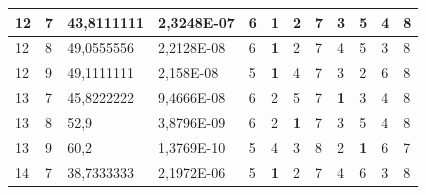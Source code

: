\documentclass[conference]{IEEEtran}
\begin{document}
\begin{table}[]
\begin{tabular}{|llll|llllllll|}
		\multicolumn{1}{|l|}{12}  & \multicolumn{1}{l|}{7}         & \multicolumn{1}{l|}{43,8111111}    & 2,3248E-07 & \multicolumn{1}{l|}{6}   & \multicolumn{1}{l|}{\textbf{1}} & \multicolumn{1}{l|}{2}          & \multicolumn{1}{l|}{7}   & \multicolumn{1}{l|}{3}          & \multicolumn{1}{l|}{5}          & \multicolumn{1}{l|}{4}          & 8                      \\ \hline
		\multicolumn{1}{|l|}{12}  & \multicolumn{1}{l|}{8}         & \multicolumn{1}{l|}{49,0555556}    & 2,2128E-08 & \multicolumn{1}{l|}{6}   & \multicolumn{1}{l|}{\textbf{1}} & \multicolumn{1}{l|}{2}          & \multicolumn{1}{l|}{7}   & \multicolumn{1}{l|}{4}          & \multicolumn{1}{l|}{5}          & \multicolumn{1}{l|}{3}          & 8                      \\ \hline
		\multicolumn{1}{|l|}{12}  & \multicolumn{1}{l|}{9}         & \multicolumn{1}{l|}{49,1111111}    & 2,158E-08  & \multicolumn{1}{l|}{5}   & \multicolumn{1}{l|}{\textbf{1}} & \multicolumn{1}{l|}{4}          & \multicolumn{1}{l|}{7}   & \multicolumn{1}{l|}{3}          & \multicolumn{1}{l|}{2}          & \multicolumn{1}{l|}{6}          & 8                      \\ \hline
		\multicolumn{1}{|l|}{13}  & \multicolumn{1}{l|}{7}         & \multicolumn{1}{l|}{45,8222222}    & 9,4666E-08 & \multicolumn{1}{l|}{6}   & \multicolumn{1}{l|}{2}          & \multicolumn{1}{l|}{5}          & \multicolumn{1}{l|}{7}   & \multicolumn{1}{l|}{\textbf{1}} & \multicolumn{1}{l|}{3}          & \multicolumn{1}{l|}{4}          & 8                      \\ \hline
		\multicolumn{1}{|l|}{13}  & \multicolumn{1}{l|}{8}         & \multicolumn{1}{l|}{52,9}          & 3,8796E-09 & \multicolumn{1}{l|}{6}   & \multicolumn{1}{l|}{2}          & \multicolumn{1}{l|}{\textbf{1}} & \multicolumn{1}{l|}{7}   & \multicolumn{1}{l|}{3}          & \multicolumn{1}{l|}{5}          & \multicolumn{1}{l|}{4}          & 8                      \\ \hline
		\multicolumn{1}{|l|}{13}  & \multicolumn{1}{l|}{9}         & \multicolumn{1}{l|}{60,2}          & 1,3769E-10 & \multicolumn{1}{l|}{5}   & \multicolumn{1}{l|}{4}          & \multicolumn{1}{l|}{3}          & \multicolumn{1}{l|}{8}   & \multicolumn{1}{l|}{2}          & \multicolumn{1}{l|}{\textbf{1}} & \multicolumn{1}{l|}{6}          & 7                      \\ \hline
		\multicolumn{1}{|l|}{14}  & \multicolumn{1}{l|}{7}         & \multicolumn{1}{l|}{38,7333333}    & 2,1972E-06 & \multicolumn{1}{l|}{5}   & \multicolumn{1}{l|}{\textbf{1}} & \multicolumn{1}{l|}{2}          & \multicolumn{1}{l|}{7}   & \multicolumn{1}{l|}{4}          & \multicolumn{1}{l|}{6}          & \multicolumn{1}{l|}{3}          & 8                      \\ \hline

\end{tabular}
\end{table}
\end{document}
